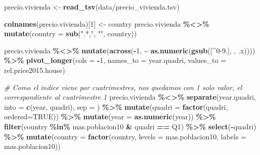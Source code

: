 \documentclass[water,article,submit,pdftex,moreauthors]{Definitions/mdpi}
\newenvironment{Shaded}{\begin{snugshade}}{\end{snugshade}}
\newcommand{\AttributeTok}[1]{\textcolor[rgb]{0.13,0.29,0.53}{#1}}
\newcommand{\CommentTok}[1]{\textcolor[rgb]{0.56,0.35,0.01}{\textit{#1}}}
\newcommand{\ConstantTok}[1]{\textcolor[rgb]{0.56,0.35,0.01}{#1}}
\newcommand{\DecValTok}[1]{\textcolor[rgb]{0.00,0.00,0.81}{#1}}
\newcommand{\FunctionTok}[1]{\textcolor[rgb]{0.13,0.29,0.53}{\textbf{#1}}}
\newcommand{\NormalTok}[1]{#1}
\newcommand{\OtherTok}[1]{\textcolor[rgb]{0.56,0.35,0.01}{#1}}
\newcommand{\SpecialCharTok}[1]{\textcolor[rgb]{0.81,0.36,0.00}{\textbf{#1}}}
\newcommand{\StringTok}[1]{\textcolor[rgb]{0.31,0.60,0.02}{#1}}
\begin{document}
\begin{Shaded}
\begin{Highlighting}[]
\NormalTok{precio.vivienda }\OtherTok{\textless{}{-}} \FunctionTok{read\_tsv}\NormalTok{(}\StringTok{\textquotesingle{}data/precio\_vivienda.tsv\textquotesingle{}}\NormalTok{)}

\FunctionTok{colnames}\NormalTok{(precio.vivienda)[}\DecValTok{1}\NormalTok{] }\OtherTok{\textless{}{-}} \StringTok{\textquotesingle{}country\textquotesingle{}}
\NormalTok{precio.vivienda }\SpecialCharTok{\%\textless{}\textgreater{}\%} \FunctionTok{mutate}\NormalTok{(}\AttributeTok{country =} \FunctionTok{sub}\NormalTok{(}\StringTok{".*,"}\NormalTok{, }\StringTok{""}\NormalTok{, country))}

\NormalTok{precio.vivienda }\SpecialCharTok{\%\textless{}\textgreater{}\%} \FunctionTok{mutate}\NormalTok{(}\FunctionTok{across}\NormalTok{(}\SpecialCharTok{{-}}\DecValTok{1}\NormalTok{, }\SpecialCharTok{\textasciitilde{}} \FunctionTok{as.numeric}\NormalTok{(}\FunctionTok{gsub}\NormalTok{(}\StringTok{\textquotesingle{}[\^{}0{-}9.]\textquotesingle{}}\NormalTok{, }\StringTok{\textquotesingle{}\textquotesingle{}}\NormalTok{, .x)))) }\SpecialCharTok{\%\textgreater{}\%} \FunctionTok{pivot\_longer}\NormalTok{(}\AttributeTok{cols =} \SpecialCharTok{{-}}\DecValTok{1}\NormalTok{, }\AttributeTok{names\_to =} \StringTok{\textquotesingle{}year.quadri\textquotesingle{}}\NormalTok{, }\AttributeTok{values\_to =} \StringTok{\textquotesingle{}rel.price2015.house\textquotesingle{}}\NormalTok{)}

\CommentTok{\# Como el indice viene por cuatrimestres, nos quedamos con 1 solo valor, el correspondiente al cuatrimestre 1}
\NormalTok{precio.vivienda }\SpecialCharTok{\%\textless{}\textgreater{}\%} \FunctionTok{separate}\NormalTok{(year.quadri, }\AttributeTok{into =} \FunctionTok{c}\NormalTok{(}\StringTok{\textquotesingle{}year\textquotesingle{}}\NormalTok{, }\StringTok{\textquotesingle{}quadri\textquotesingle{}}\NormalTok{), }\AttributeTok{sep =} \StringTok{\textquotesingle{}{-}\textquotesingle{}}\NormalTok{) }\SpecialCharTok{\%\textgreater{}\%} \FunctionTok{mutate}\NormalTok{(}\AttributeTok{quadri =} \FunctionTok{factor}\NormalTok{(quadri, }\AttributeTok{ordered=}\ConstantTok{TRUE}\NormalTok{)) }\SpecialCharTok{\%\textgreater{}\%} \FunctionTok{mutate}\NormalTok{(}\AttributeTok{year =} \FunctionTok{as.numeric}\NormalTok{(year)) }\SpecialCharTok{\%\textgreater{}\%} \FunctionTok{filter}\NormalTok{(country }\SpecialCharTok{\%in\%}\NormalTok{ mas.poblacion10 }\SpecialCharTok{\&}\NormalTok{ quadri }\SpecialCharTok{==} \StringTok{\textquotesingle{}Q1\textquotesingle{}}\NormalTok{) }\SpecialCharTok{\%\textgreater{}\%} \FunctionTok{select}\NormalTok{(}\SpecialCharTok{{-}}\NormalTok{quadri) }\SpecialCharTok{\%\textgreater{}\%} \FunctionTok{mutate}\NormalTok{(}\AttributeTok{country =} \FunctionTok{factor}\NormalTok{(country, }\AttributeTok{levels =}\NormalTok{ mas.poblacion10, }\AttributeTok{labels =}\NormalTok{ mas.poblacion10))}
\end{Highlighting}
\end{Shaded}
\end{document}

